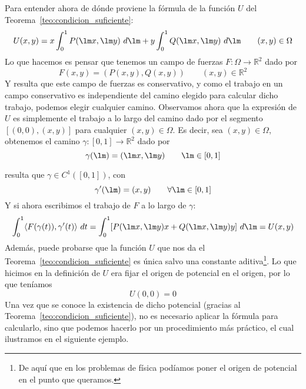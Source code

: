 \noindent
Para entender ahora de dónde proviene la fórmula de la función $U$ del Teorema~\ref{teo:condicion_suficiente}:
\begin{equation*}
    U(x,y) = x\int_{0}^{1} P(\lm x,\lm y)~d\lm + y\int_{0}^{1} Q(\lm x,\lm y)~d\lm  \qquad (x,y)\in \Omega
\end{equation*}
Lo que hacemos es pensar que tenemos un campo de fuerzas $F:\Omega\rightarrow\mathbb{R}^2$ dado por
\begin{equation*}
    F(x,y) = (P(x,y),Q(x,y)) \qquad (x,y)\in \mathbb{R}^2
\end{equation*}
Y resulta que este campo de fuerzas es conservativo, y como el trabajo en un campo conservativo es independiente del camino elegido para calcular dicho trabajo, podemos elegir cualquier camino. Observamos ahora que la expresión de $U$ es simplemente el trabajo a lo largo del camino dado por el segmento $[(0,0),(x,y)]$ para cualquier $(x,y)\in \Omega$. Es decir, sea $(x,y)\in \Omega$, obtenemos el camino $\gamma:[0,1]\rightarrow\mathbb{R}^2$ dado por
\begin{equation*}
    \gamma(\lm) = (\lm x,\lm y) \qquad \lm \in [0,1]
\end{equation*}

resulta que $\gamma\in C^1([0,1])$, con
\begin{equation*}
    \gamma'(\lm) = (x,y) \qquad \forall \lm\in [0,1]
\end{equation*}
Y si ahora escribimos el trabajo de $F$ a lo largo de $\gamma$:
\begin{equation*}
    \int_{0}^{1} \langle F(\gamma(t)),\gamma'(t) \rangle~dt = \int_{0}^{1} [P(\lm x,\lm y)x+Q(\lm x,\lm y)y]~d\lm  = U(x,y)
\end{equation*}
Además, puede probarse que la función $U$ que nos da el Teorema~\ref{teo:condicion_suficiente} es única salvo una constante aditiva\footnote{De aquí que en los problemas de física podíamos poner el origen de potencial en el punto que queramos.}. Lo que hicimos en la definición de $U$ era fijar el origen de potencial en el origen, por lo que teníamos
\begin{equation*}
    U(0,0) = 0
\end{equation*}
Una vez que se conoce la existencia de dicho potencial (gracias al Teorema~\ref{teo:condicion_suficiente}), no es necesario aplicar la fórmula para calcularlo, sino que podemos hacerlo por un procedimiento más práctico, el cual ilustramos en el siguiente ejemplo.

